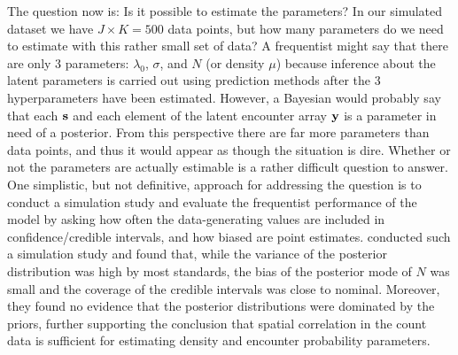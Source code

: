 The question now is: Is it possible to estimate the parameters? In our
simulated dataset we have $J \times K = 500$ data points, but how many
parameters do we need to estimate with this rather small set of data?
A frequentist might say that there are only 3 parameters: $\lambda_0$,
$\sigma$, and $N$ (or density $\mu$) because inference about the
latent parameters is carried out using prediction methods after the 3
hyperparameters have been estimated. However, a Bayesian would
probably say that each $\bf s$ and each element of the latent
encounter array $\bf y$ is a parameter in need of a posterior. From
this perspective there are far more parameters than data points, and
thus it would appear as though the situation is dire. Whether or not
the parameters are actually estimable is a rather difficult question
to answer. One simplistic, but not definitive, approach for addressing
the question is to conduct a simulation study and evaluate the
frequentist performance of the model by asking how often the
data-generating values are included in confidence/credible intervals,
and how biased are point estimates. \citet{chandler_royle:2012}
conducted such a simulation study and found that, while the variance
of the posterior distribution was high by most standards, the
bias of
the posterior mode of $N$ was small and the coverage of the credible
intervals was close to nominal. Moreover, they found no evidence that the
posterior distributions were dominated by the priors, further
supporting the conclusion that spatial correlation in the count data
is sufficient for estimating density and encounter probability
parameters. %

